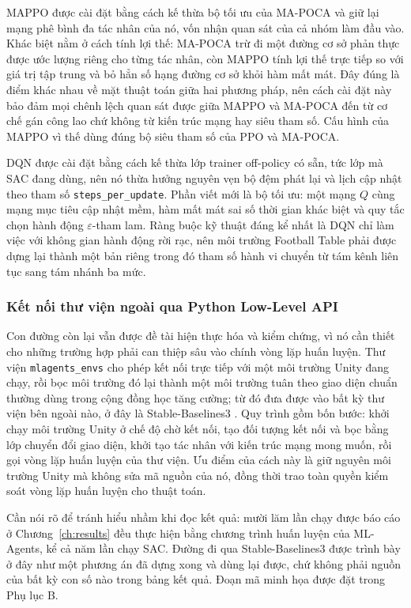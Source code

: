 \indent MAPPO được cài đặt bằng cách kế thừa bộ tối ưu của MA-POCA và giữ lại mạng phê
bình đa tác nhân của nó, vốn nhận quan sát của cả nhóm làm đầu vào. Khác biệt nằm ở
cách tính lợi thế: MA-POCA trừ đi một đường cơ sở phản thực được ước lượng riêng cho
từng tác nhân, còn MAPPO tính lợi thế trực tiếp so với giá trị tập trung và bỏ hẳn số
hạng đường cơ sở khỏi hàm mất mát. Đây đúng là điểm khác nhau về mặt thuật toán giữa
hai phương pháp, nên cách cài đặt này bảo đảm mọi chênh lệch quan sát được giữa MAPPO
và MA-POCA đến từ cơ chế gán công lao chứ không từ kiến trúc mạng hay siêu tham số.
Cấu hình của MAPPO vì thế dùng đúng bộ siêu tham số của PPO và MA-POCA.

\indent DQN được cài đặt bằng cách kế thừa lớp trainer off-policy có sẵn, tức lớp mà
SAC đang dùng, nên nó thừa hưởng nguyên vẹn bộ đệm phát lại và lịch cập nhật theo tham
số \texttt{steps\_per\_update}. Phần viết mới là bộ tối ưu: một mạng $Q$ cùng mạng mục
tiêu cập nhật mềm, hàm mất mát sai số thời gian khác biệt và quy tắc chọn hành động
$\varepsilon$-tham lam. Ràng buộc kỹ thuật đáng kể nhất là DQN chỉ làm việc với không
gian hành động rời rạc, nên môi trường Football Table phải được dựng lại thành một bản
riêng trong đó tham số hành vi chuyển từ tám kênh liên tục sang tám nhánh ba mức.

\subsubsection{Kết nối thư viện ngoài qua Python Low-Level API}
\indent Con đường còn lại vẫn được đề tài hiện thực hóa và kiểm chứng, vì nó cần thiết
cho những trường hợp phải can thiệp sâu vào chính vòng lặp huấn luyện. Thư viện
\texttt{mlagents\_envs} cho phép kết nối trực tiếp với một môi trường Unity đang chạy,
rồi bọc môi trường đó lại thành một môi trường tuân theo giao diện chuẩn thường dùng
trong cộng đồng học tăng cường; từ đó đưa được vào bất kỳ thư viện bên ngoài nào, ở đây
là Stable-Baselines3 \cite{raffin2021stable}. Quy trình gồm bốn bước: khởi chạy môi
trường Unity ở chế độ chờ kết nối, tạo đối tượng kết nối và bọc bằng lớp chuyển đổi
giao diện, khởi tạo tác nhân với kiến trúc mạng mong muốn, rồi gọi vòng lặp huấn luyện
của thư viện. Ưu điểm của cách này là giữ nguyên môi trường Unity mà không sửa mã nguồn
của nó, đồng thời trao toàn quyền kiểm soát vòng lặp huấn luyện cho thuật toán.

\indent Cần nói rõ để tránh hiểu nhầm khi đọc kết quả: mười lăm lần chạy được báo cáo ở
Chương~\ref{ch:results} đều thực hiện bằng chương trình huấn luyện của ML-Agents, kể cả
năm lần chạy SAC. Đường đi qua Stable-Baselines3 được trình bày ở đây như một phương án
đã dựng xong và dùng lại được, chứ không phải nguồn của bất kỳ con số nào trong bảng
kết quả. Đoạn mã minh họa được đặt trong Phụ lục B.


